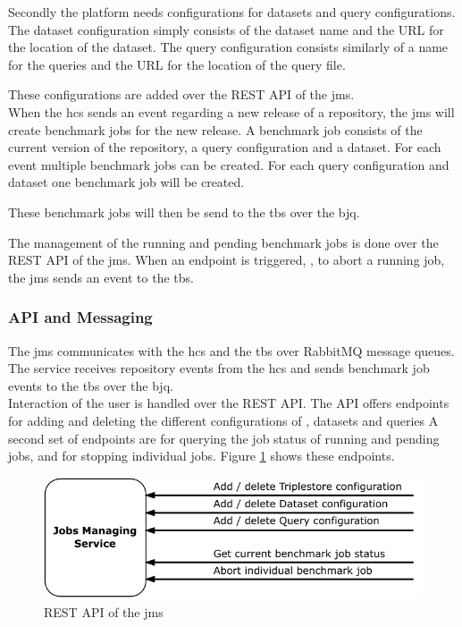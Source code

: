 Secondly the platform needs configurations for datasets and query configurations.
The dataset configuration simply consists of the dataset name and the URL for the location of the dataset.
The query configuration consists similarly of a name for the queries and the URL for the location of the query file.

These configurations are added over the REST API of the \ac{jms}.
\\

When the \ac{hcs} sends an event regarding a new release of a repository, the \ac{jms} will create benchmark jobs for the new release.
A benchmark job consists of the current version of the repository, a query configuration and a dataset.
For each event multiple benchmark jobs can be created.
For each query configuration and dataset one benchmark job will be created.

These benchmark jobs will then be send to the \acl{tbs} over the \acl{bjq}.

The management of the running and pending benchmark jobs is done over the REST API of the \ac{jms}.
When an endpoint is triggered, \eg, to abort a running job, the \ac{jms} sends an event to the \acl{tbs}.


\subsubsection{API and Messaging}
\label{sec:jobs_api}
The \ac{jms} communicates with the \ac{hcs} and the \acl{tbs} over RabbitMQ message queues.
The service receives repository events from the \ac{hcs} and sends benchmark job events to the \acl{tbs} over the \ac{bjq}.
\\

Interaction of the user is handled over the REST API.
The API offers endpoints for adding and deleting the different configurations of \tsp{}, datasets and queries
A second set of endpoints are for querying the job status of running and pending jobs, and for stopping individual jobs.
Figure \ref{fig:rest_apis_approach_jms} shows these endpoints.
\begin{figure}[tbph]
	\centering
	\includegraphics[width=.57\textwidth]{figures/rest-apis-approach-jms.pdf}
	\caption{REST API of the \acl{jms}}
	\label{fig:rest_apis_approach_jms}
\end{figure}


